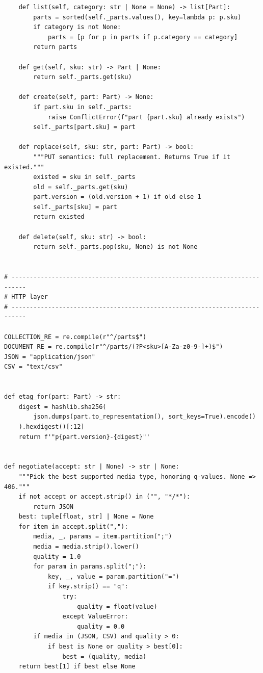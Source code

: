 \begin{verbatim}
    def list(self, category: str | None = None) -> list[Part]:
        parts = sorted(self._parts.values(), key=lambda p: p.sku)
        if category is not None:
            parts = [p for p in parts if p.category == category]
        return parts

    def get(self, sku: str) -> Part | None:
        return self._parts.get(sku)

    def create(self, part: Part) -> None:
        if part.sku in self._parts:
            raise ConflictError(f"part {part.sku} already exists")
        self._parts[part.sku] = part

    def replace(self, sku: str, part: Part) -> bool:
        """PUT semantics: full replacement. Returns True if it existed."""
        existed = sku in self._parts
        old = self._parts.get(sku)
        part.version = (old.version + 1) if old else 1
        self._parts[sku] = part
        return existed

    def delete(self, sku: str) -> bool:
        return self._parts.pop(sku, None) is not None


# --------------------------------------------------------------------------
# HTTP layer
# --------------------------------------------------------------------------

COLLECTION_RE = re.compile(r"^/parts$")
DOCUMENT_RE = re.compile(r"^/parts/(?P<sku>[A-Za-z0-9-]+)$")
JSON = "application/json"
CSV = "text/csv"


def etag_for(part: Part) -> str:
    digest = hashlib.sha256(
        json.dumps(part.to_representation(), sort_keys=True).encode()
    ).hexdigest()[:12]
    return f'"p{part.version}-{digest}"'


def negotiate(accept: str | None) -> str | None:
    """Pick the best supported media type, honoring q-values. None => 406."""
    if not accept or accept.strip() in ("", "*/*"):
        return JSON
    best: tuple[float, str] | None = None
    for item in accept.split(","):
        media, _, params = item.partition(";")
        media = media.strip().lower()
        quality = 1.0
        for param in params.split(";"):
            key, _, value = param.partition("=")
            if key.strip() == "q":
                try:
                    quality = float(value)
                except ValueError:
                    quality = 0.0
        if media in (JSON, CSV) and quality > 0:
            if best is None or quality > best[0]:
                best = (quality, media)
    return best[1] if best else None



\end{verbatim}
